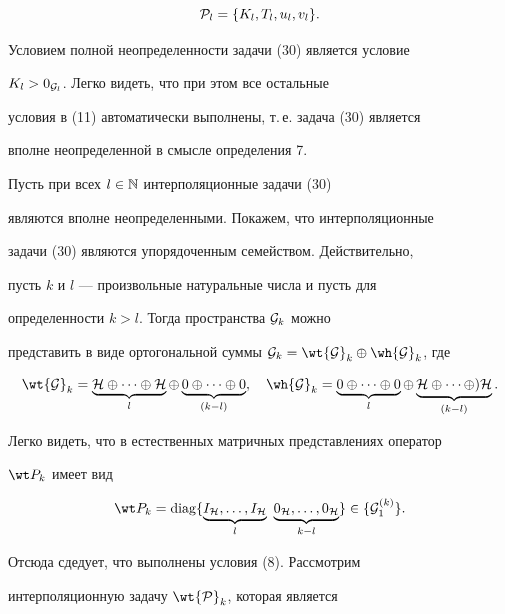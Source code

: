 \begin{exam}
$$


{\cal P}_l = \{ K_l,T_l,u_l,v_l\}.


$$


Условием полной неопределенности задачи (30) является условие


$K_l>0_{{\cal G}_l}$. Легко видеть, что при этом все остальные


условия в (11) автоматически выполнены, т.\,е. задача (30) является


вполне неопределенной в смысле определения 7.





Пусть при всех $l\in {\Bbb N}$ интерполяционные задачи (30)


являются вполне неопределенными. Покажем, что интерполяционные


задачи (30) являются упорядоченным семейством. Действительно,


пусть $k$ и $l$ --- произвольные натуральные числа и пусть для


определенности $k>l$. Тогда пространства ${\cal G}_k$ можно


представить в виде ортогональной суммы ${\cal G}_k=\wt {\cal


G}_k\oplus \wh {\cal G}_k$, где


$$


\wt {\cal G}_k= \underbrace{{\cal H}\oplus \dotsb \oplus {\cal H}}_{l}


\oplus


\underbrace{0\oplus \dotsb \oplus 0}_{(k-l)},\quad


\wh {\cal G}_k= \underbrace { 0\oplus \dotsb \oplus 0 }_{l}


\oplus


\underbrace { {\cal H}\oplus \dotsb \oplus ){\cal H} }_{(k-l)}.


$$


Легко видеть, что в естественных матричных представлениях оператор


$\wt P_k$ имеет вид


$$


\wt P_k=\diag \{ \underbrace { I_{\cal H},\dotsc


,I_{\cal H}}_l\ \underbrace { 0_{\cal H},\dotsc,0_{\cal H}}_{k-l}


\} \in \{ {\cal G}_1^{(k)} \}.


$$


Отсюда сдедует, что выполнены условия (8). Рассмотрим


интерполяционную задачу $\wt {\cal P}_k$, которая является



\end{exam}
